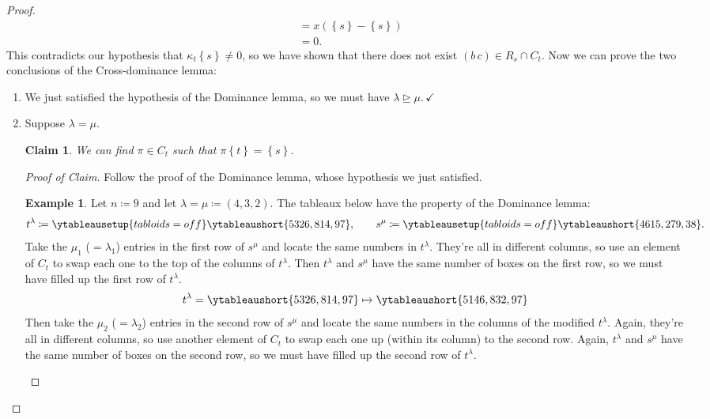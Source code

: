 \documentclass[12pt]{article}
\newcommand\paren[1]{\left( #1 \right)}
\newcommand\setb[1]{\left \{ #1 \right \}}
\newtheorem*{claim}{Claim}
\theoremstyle{definition}
\newtheorem{example}{Example}[section]
\begin{document}
\begin{proof}
\begin{align*}
        & = x \paren{ \setb{ s } - \setb{ s } } \\
        & = 0.
    \end{align*}
    This contradicts our hypothesis that $\kappa_t \setb{ s } \neq 0$, so we have shown that there does not exist $(b\,c) \in R_s \cap C_t$. Now we can prove the two conclusions of the Cross-dominance lemma:
    \begin{enumerate}
        \item We just satisfied the hypothesis of the Dominance lemma, so we must have $\boxed{ \lambda \trianglerighteq \mu . } \, \checkmark$
        \item Suppose $\lambda = \mu$.
        \begin{claim}
            We can find $\pi \in C_t$ such that $\pi \setb{ t } = \setb{ s }$.
        \end{claim}
        \begin{proof}[Proof of Claim]
            Follow the proof of the Dominance lemma, whose hypothesis we just satisfied.
            \begin{example}
                Let $n \coloneqq  9$ and let $\lambda = \mu \coloneqq  (4,3,2)$. The tableaux below have the property of the Dominance lemma:
                \begin{equation*}
                    t^{\lambda} \coloneqq  
                    \ytableausetup{tabloids = off}
                    \ytableaushort{5326,814,97} , 
                    \qquad 
                    s^{\mu} \coloneqq 
                    \ytableausetup{tabloids = off}
                    \ytableaushort{4615,279,38}.
                \end{equation*}
                Take the $\mu_1$ ($=\lambda_1$) entries in the first row of $s^{\mu}$ and locate the same numbers in $t^{\lambda}$. They're all in different columns, so use an element of $C_t$ to swap each one to the top of the columns of $t^{\lambda}$. Then $t^{\lambda}$ and $s^{\mu}$ have the same number of boxes on the first row, so we must have filled up the first row of $t^{\lambda}$.
                \begin{equation*}
                    t^{\lambda} = \ytableaushort{5326,814,97} \mapsto 
                    \ytableaushort{5146,832,97}
                \end{equation*}
                Then take the $\mu_2$ ($=\lambda_2$) entries in the second row of $s^{\mu}$ and locate the same numbers in the columns of the modified $t^{\lambda}$. Again, they're all in different columns, so use another element of $C_t$ to swap each one up (within its column) to the second row. Again, $t^{\lambda}$ and $s^{\mu}$ have the same number of boxes on the second row, so we must have filled up the second row of $t^{\lambda}$.

\end{example}
\end{proof}
\end{enumerate}
\end{proof}
\end{document}

